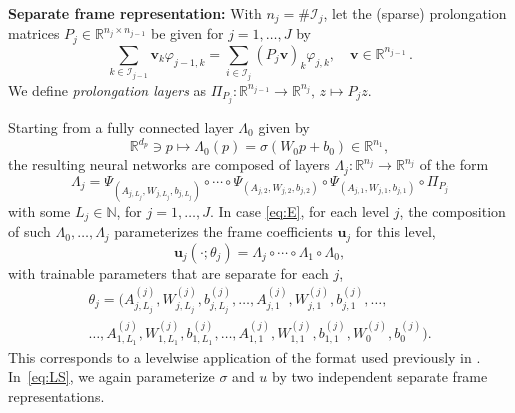 \documentclass[a4paper,11pt]{amsart}
\numberwithin{equation}{section}
\theoremstyle{definition}
\theoremstyle{remark}
\theoremstyle{plain}
\newcommand{\R}{\mathbb{R}}
\newcommand{\N}{\mathbb{N}}
\begin{document}
\textbf{Separate frame representation: }
With $n_j = \#\mathcal{I}_j$, let the (sparse) prolongation matrices $P_j\in\mathbb R^{n_j \times n_{j-1}}$ be given for $j = 1,\ldots,J$ by
\begin{equation}\label{eq:prolongationdef}
   \sum_{k \in \mathcal{I}_{j-1}} \mathbf{v}_k \varphi_{j-1,k} =
   \sum_{i \in \mathcal{I}_{j}} (P_j \mathbf{v})_k \varphi_{j,k}
   , \quad \mathbf{v} \in  \R^{n_{j-1}}\,.
\end{equation}
We define \emph{prolongation layers} as $\Pi_{P_{j}} \colon \R^{n_{j-1}} \to \R^{n_j}, \, z\mapsto P_{j} z$.

Starting from a fully connected layer $\Lambda_0$ given by
\[  \R^{d_p}  \ni p \mapsto \Lambda_0(p) = \sigma(W_0 p + b_0) \in \R^{n_1}, \]
the resulting neural networks are composed of layers $\Lambda_j \colon \R^{n_j} \to \R^{n_j}$ of the form
\begin{equation}\label{eq:Lambdaj}
   \Lambda_j = \Psi_{(A_{j,L_j}, W_{j,L_j}, b_{j,L_j})} \circ \cdots
   \circ  \Psi_{(A_{j,2}, W_{j,2}, b_{j,2})} 
   \circ \Psi_{(A_{j,1}, W_{j,1}, b_{j,1})} \circ\Pi_{P_j}
\end{equation}
with some $L_j \in \N$, for $j = 1,\ldots,J$. 
In case \eqref{eq:E}, for each level $j$, the composition of such $\Lambda_0,\ldots, \Lambda_j$ parameterizes the frame coefficients $\mathbf u_j$ for this level,
\[
\mathbf{u}_{j}( \cdot; \theta_j)
= \Lambda_j \circ \cdots \circ \Lambda_1 \circ \Lambda_0,
\]
with trainable parameters that are separate for each $j$,
\begin{multline*}
   \theta_j = (A_{j,L_j}^{(j)}, W_{j,L_j}^{(j)}, b_{j,L_j}^{(j)}, \ldots, A_{j,1}^{(j)}, W_{j,1}^{(j)}, b_{j,1}^{(j)}, \ldots, \\ 
   \ldots, A_{1,L_1}^{(j)}, W_{1,L_1}^{(j)}, b_{1,L_1}^{(j)}, \ldots, A_{1,1}^{(j)}, W_{1,1}^{(j)}, b_{1,1}^{(j)}, W_0^{(j)}, b_0^{(j)})  .
\end{multline*}
This corresponds to a levelwise application of the format used previously in \cite{BachmayrDahmenOster2024}.
In~\eqref{eq:LS}, we again parameterize $\sigma$ and $u$ by two independent separate frame representations.
\end{document}
